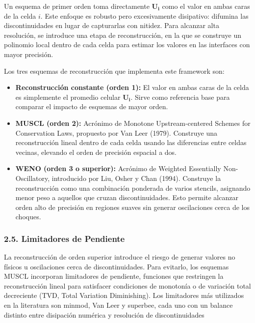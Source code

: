 \documentclass[11pt,openany]{book}
\begin{document}
Un esquema de primer orden toma directamente $\mathbf{U_i}$ como el valor en ambas caras de la celda $i$. Este enfoque es robusto pero excesivamente disipativo: difumina las discontinuidades en lugar de capturarlas con nitidez. Para alcanzar alta resolución, se introduce una etapa de reconstrucción, en la que se construye un polinomio local dentro de cada celda para estimar los valores en las interfaces con mayor precisión.

Los tres esquemas de reconstrucción que implementa este framework son:

\begin{itemize}
    \item \textbf{Reconstrucción constante (orden 1): }El valor en ambas caras de la celda es simplemente el promedio celular $\mathbf{U_i}$. Sirve como referencia base para comparar el impacto de esquemas de mayor orden.
    \item \textbf{MUSCL (orden 2): }Acrónimo de Monotone Upstream-centered Schemes for Conservation Laws, propuesto por Van Leer (1979). Construye una reconstrucción lineal dentro de cada celda usando las diferencias entre celdas vecinas, elevando el orden de precisión espacial a dos.
    \item \textbf{WENO (orden 3 o superior): } Acrónimo de Weighted Essentially Non-Oscillatory, introducido por Liu, Osher y Chan (1994). Construye la reconstrucción como una combinación ponderada de varios stencils, asignando menor peso a aquellos que cruzan discontinuidades. Esto permite alcanzar orden alto de precisión en regiones suaves sin generar oscilaciones cerca de los choques.
\end{itemize}

\subsubsection{2.5. Limitadores de Pendiente}\textbf{}

La reconstrucción de orden superior introduce el riesgo de generar valores no físicos u oscilaciones cerca de discontinuidades. Para evitarlo, los esquemas MUSCL incorporan limitadores de pendiente, funciones que restringen la reconstrucción lineal para satisfacer condiciones de monotonía o de variación total decreciente (TVD, Total Variation Diminishing). Los limitadores más utilizados en la literatura son minmod, Van Leer y superbee, cada uno con un balance distinto entre disipación numérica y resolución de discontinuidades \parencite{toro2013riemann}
\end{document}
